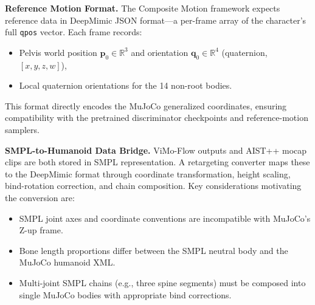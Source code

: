 \textbf{Reference Motion Format.} The Composite Motion framework expects reference data in DeepMimic JSON format---a per-frame array of the character's full \texttt{qpos} vector. Each frame records:
\begin{itemize}
    \item Pelvis world position $\mathbf{p}_0 \in \mathbb{R}^3$ and orientation $\mathbf{q}_0 \in \mathbb{R}^4$ (quaternion, $[x,y,z,w]$),
    \item Local quaternion orientations for the 14 non-root bodies.
\end{itemize}
This format directly encodes the MuJoCo generalized coordinates, ensuring compatibility with the pretrained discriminator checkpoints and reference-motion samplers.

\textbf{SMPL-to-Humanoid Data Bridge.} ViMo-Flow outputs and AIST++ mocap clips are both stored in SMPL representation. A retargeting converter maps these to the DeepMimic format through coordinate transformation, height scaling, bind-rotation correction, and chain composition. Key considerations motivating the conversion are:
\begin{itemize}
    \item SMPL joint axes and coordinate conventions are incompatible with MuJoCo's Z-up frame.
    \item Bone length proportions differ between the SMPL neutral body and the MuJoCo humanoid XML.
    \item Multi-joint SMPL chains (e.g., three spine segments) must be composed into single MuJoCo bodies with appropriate bind corrections.
\end{itemize}
